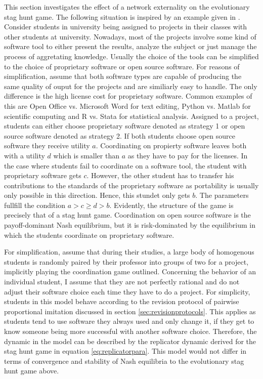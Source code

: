 \label{sec:simplemodel}
This section investigates the effect of a network externality on the
evolutionary stag hunt game. The following situation is inspired by an
example given in \textcite{kandori_learning_1993}. 
Consider students in university being assigned to
projects in their classes with other students at university. 
Nowadays, most of the projects involve some kind of software tool to either 
present the results, analyze the subject or just manage the process of aggretating 
knowledge. Usually the choice of the tools can be simplified to 
the choice of proprietary software or open source software. 
For reasons of simplification, assume that both 
software types are capable of producing
the same quality of ouput for the projects and are similiarly easy to handle.
The only difference is the high license cost for proprietary software.
Common examples of this are Open Office vs. Microsoft Word for text editing,
Python vs. Matlab for scientific computing and R vs. Stata for statistical
analysis. Assigned to a project, students can either choose proprietary
software denoted as strategy 1 or open source software denoted as strategy 2.
If both students choose open source software they receive utility $a$.
Coordinating on propierty software leaves both with a utility $d$ which is
smaller than $a$ as they have to pay for the licenses. In the case 
where students fail to coordinate on a software tool, the student
with proprietary software gets $c$. However, the other student
has to transfer his contributions to the standards of the proprietary software
as portability is usually only possible in this direction.
Hence, this stundet only gets $b$. The parameters fullfill 
the condition $a > c \geq d >b$.
Evidently, the structure of the game is precisely that of a stag hunt game. 
Coordination on open source software is the payoff-dominant Nash equilibrium,
but it is risk-dominated by the equilibrium in which the students 
coordinate on proprietary software. 

For simplification, assume that during their studies, a large body of 
homogenous students is randomly paired by their professor into groups of two 
for a project, implicitly playing the coordination game outlined. 
Concerning the behavior of an individual student, I assume that they are 
not perfectly rational and do not adjust their software choice 
each time they have to do a project.
For simplicity, students in this model behave according to the 
revision protocol of pairwise proportional imitation discussed in section 
\ref{sec:revisionprotocols}. 
This applies as students tend to use software they always used and 
only change it, if they get to know someone being more successful with
another software choice. Therefore, the dynamic in the model can be 
described by the replicator dynamic derived for the stag hunt game in 
equation \eqref{eq:replicatorpara}.
This model would not differ in terms of convergence and stability of Nash 
equilibria to the evolutionary stag hunt game above.

